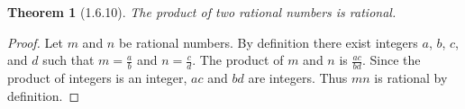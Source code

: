 \documentclass[a4paper, 12pt]{article}
\theoremstyle{plain}
\newtheorem*{theorem*}{Theorem}
\begin{document}
	
	\begin{theorem*}[1.6.10]
		The product of two rational numbers is rational.
	\end{theorem*}
	
	\begin{proof}
		Let $m$ and $n$ be rational numbers. By definition there exist integers $a$, $b$, $c$, and $d$ such 
		that $m = \frac{a}{b}$ and $n = \frac{c}{d}$. The product of $m$ and $n$ is $\frac{ac}{bd}$. Since 
		the product of integers is an integer, $ac$ and $bd$ are integers. Thus $mn$ is rational by 
		definition.
	\end{proof}
\end{document}
